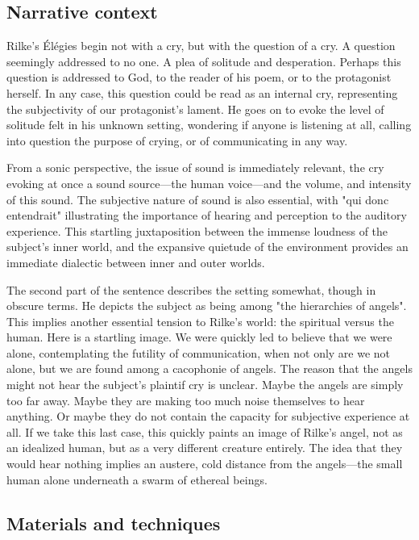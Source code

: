 \documentclass[12pt,twoside,maitrise]{dms_ks}
\theoremstyle{definition}
\begin{document}
\subsection{Narrative context}
Rilke's Élégies begin not with a cry, but with the question of a cry.
A question seemingly addressed to no one.
A plea of solitude and desperation.
Perhaps this question is addressed to God, to the reader of his poem, or to the protagonist herself.
In any case, this question could be read as an internal cry, representing the subjectivity of our protagonist's lament.
He goes on to evoke the level of solitude felt in his unknown setting, wondering if anyone is listening at all, calling into question the purpose of crying, or of communicating in any way.

From a sonic perspective, the issue of sound is immediately relevant, the cry evoking at once a sound source---the human voice---and the volume, and intensity of this sound.
The subjective nature of sound is also essential, with "qui donc entendrait" illustrating the importance of hearing and perception to the auditory experience.
This startling juxtaposition between the immense loudness of the subject's inner world, and the expansive quietude of the environment provides an immediate dialectic between inner and outer worlds.

The second part of the sentence describes the setting somewhat, though in obscure terms.
He depicts the subject as being among "the hierarchies of angels".
This implies another essential tension to Rilke's world: the spiritual versus the human.
Here is a startling image.
We were quickly led to believe that we were alone, contemplating the futility of communication, when not only are we not alone, but we are found among a cacophonie of angels.
The reason that the angels might not hear the subject's plaintif cry is unclear. 
Maybe the angels are simply too far away.
Maybe they are making too much noise themselves to hear anything.
Or maybe they do not contain the capacity for subjective experience at all.
If we take this last case, this quickly paints an image of Rilke's angel, not as an idealized human, but as a very different creature entirely.
The idea that they would hear nothing implies an austere, cold distance from the angels---the small human alone underneath a swarm of ethereal beings.

\subsection{Materials and techniques}
\end{document}
